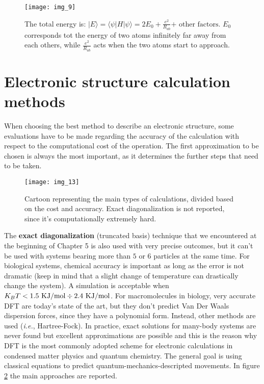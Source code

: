 	\begin{figure}[htbp!]
		\centering
		\texttt{[image: img\_9]}
		\caption{The total energy is: $|E \rangle = \langle \psi | H | \psi \rangle = 2E_0 + \frac{e^2}{R_{ab}} \text{+ other factors}$.
							$E_0$ corresponds tot the energy of two atoms infinitely far away from each others, while $\frac{e^2}{R_{ab}}$ acts when the two atoms start to approach.}
		\label{fig:variational}
	\end{figure}

\section{Electronic structure calculation methods}
When choosing the best method to describe an electronic structure, some evaluations have to be made regarding the accuracy of the calculation with respect to the computational cost of the operation.
The first approximation to be chosen is always the most important, as it determines the further steps that need to be taken.

\begin{figure}[htbp!]
	\centering
	\texttt{[image: img\_13]}
	\caption{Cartoon representing the main types of calculations, divided based on the cost and accuracy. Exact diagonalization is not reported, since it's computationally extremely hard.}
\label{fig:calculations}
\end{figure}

	The \textbf{exact diagonalization} (truncated basis) technique that we encountered at the beginning of Chapter 5 is also used with very precise outcomes, but it can't be used with systems bearing more than $5$ or $6$ particles at the same time.
	For biological systems, chemical accuracy is important as long as the error is not dramatic (keep in mind that a slight change of temperature can drastically change the system). A simulation is acceptable when $K_BT < 1.5\text{ KJ/mol} \divisionsymbol 2.4 \text{ KJ/mol}$.
	For macromolecules in biology, very accurate DFT are today's state of the art, but they don't predict Van Der Waals dispersion forces, since they have a polynomial form. Instead, other methods are used (\textit{i.e.}, Hartree-Fock).
	In practice, exact solutions for many-body systems are never found but excellent approximations are possible and this is the reason why DFT is the most commonly adopted scheme for electronic calculations in condensed matter physics and quantum chemistry.
	The general goal is using classical equations to predict quantum-mechanics-descripted movements. In figure \ref{fig:calculations} the main approaches are reported.

